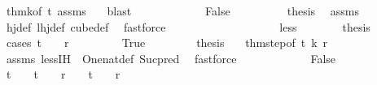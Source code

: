 \begin{isabellebody}
\ thm{}{\isacharunderscore}{\kern0pt}k{\isacharunderscore}{\kern0pt}{}{\isacharbrackleft}{\kern0pt}of\ {\isachardoublequoteopen}t{\isachardoublequoteclose}{\isacharbrackright}{\kern0pt}\ assms\ {}\ \isamarkupfalse%
\ blast\isanewline
\ \ \ \ \isamarkupfalse%
\isanewline
\ \ \ \ \ \ \isamarkupfalse%
\ False\isanewline
\ \ \ \ \ \ \isamarkupfalse%
\ \isamarkupfalse%
\ {\isacharquery}{\kern0pt}thesis\ \isamarkupfalse%
\ assms\ \isamarkupfalse%
\ hj{\isacharunderscore}{\kern0pt}def\ lhj{\isacharunderscore}{\kern0pt}def\ cube{\isacharunderscore}{\kern0pt}def\ \isamarkupfalse%
\ fastforce\isanewline
\ \ \ \ \isamarkupfalse%
\isanewline
\ \ \isamarkupfalse%
\isanewline
\ \ \ \ \isamarkupfalse%
\ {}\isanewline
\ \ \ \ \isamarkupfalse%
\ less\isanewline
\ \ \ \ \isamarkupfalse%
\ \isamarkupfalse%
\ {\isacharquery}{\kern0pt}thesis\isanewline
\ \ \ \ \isamarkupfalse%
\ {\isacharparenleft}{\kern0pt}cases\ {\isachardoublequoteopen}t\ {\isachargreater}{\kern0pt}\ {}\ {\isasymand}\ r\ {\isachargreater}{\kern0pt}\ {}{\isachardoublequoteclose}{\isacharparenright}{\kern0pt}\isanewline
\ \ \ \ \ \isamarkupfalse%
\ True\isanewline
\ \ \ \ \ \isamarkupfalse%
\ \isamarkupfalse%
\ {\isacharquery}{\kern0pt}thesis\ \ \isamarkupfalse%
\ thm{}{\isacharunderscore}{\kern0pt}step{\isacharbrackleft}{\kern0pt}of\ t\ {\isachardoublequoteopen}k{\isacharminus}{\kern0pt}{}{\isachardoublequoteclose}\ r{\isacharbrackright}{\kern0pt}\isanewline
\ \ \ \ \ \ \ \isamarkupfalse%
\ assms\ less{\isachardot}{\kern0pt}IH\ {}\ One{\isacharunderscore}{\kern0pt}nat{\isacharunderscore}{\kern0pt}def\ Suc{\isacharunderscore}{\kern0pt}pred\ \isamarkupfalse%
\ fastforce\isanewline
\ \ \ \ \isamarkupfalse%
\isanewline
\ \ \ \ \ \ \isamarkupfalse%
\ False\isanewline
\ \ \ \ \ \ \isamarkupfalse%
\ \isamarkupfalse%
\ {\isachardoublequoteopen}t\ {\isacharequal}{\kern0pt}\ {}{\isachardoublequoteclose}\ {\isacharbar}{\kern0pt}\ {\isachardoublequoteopen}t\ {\isachargreater}{\kern0pt}\ {}\ {\isasymand}\ r\ {\isacharequal}{\kern0pt}\ {}{\isachardoublequoteclose}\ {\isacharbar}{\kern0pt}\ {\isachardoublequoteopen}t\ {\isacharequal}{\kern0pt}\ {}\ {\isasymand}\ r\ {\isacharequal}{\kern0pt}\ {}{\isachardoublequoteclose}\ \isamarkupfalse%

\end{isabellebody}
